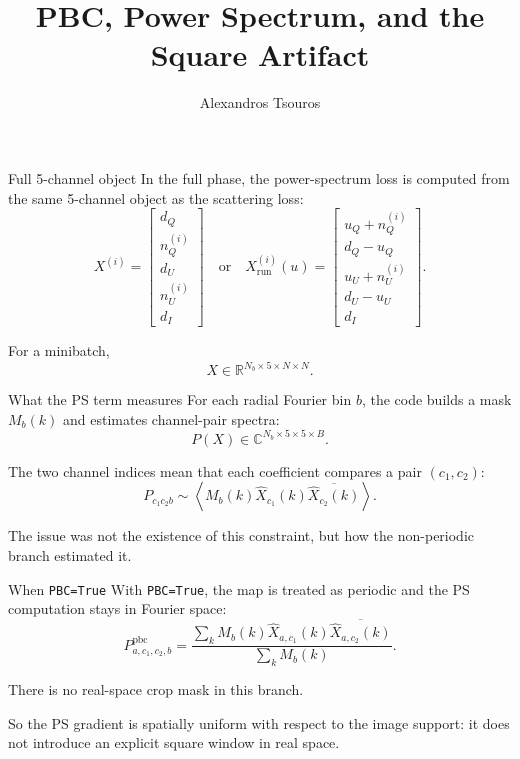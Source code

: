 \documentclass[aspectratio=169,11pt]{beamer}
\title[PBC and PS Artifact]{PBC, Power Spectrum, and the Square Artifact}
\author{Alexandros Tsouros}
\date{}
\begin{document}
\begin{frame}[fragile]
  \titlepage
\end{frame}

\begin{frame}[fragile]{Full 5-channel object}
In the full phase, the power-spectrum loss is computed from the same
5-channel object as the scattering loss:
\[
  X^{(i)}
  =
  \begin{bmatrix}
    d_Q\\
    n_Q^{(i)}\\
    d_U\\
    n_U^{(i)}\\
    d_I
  \end{bmatrix}
  \quad\text{or}\quad
  X_{\mathrm{run}}^{(i)}(u)
  =
  \begin{bmatrix}
    u_Q+n_Q^{(i)}\\
    d_Q-u_Q\\
    u_U+n_U^{(i)}\\
    d_U-u_U\\
    d_I
  \end{bmatrix}.
\]

\vspace{0.25em}
For a minibatch,
\[
  X\in\mathbb{R}^{N_b\times5\times N\times N}.
\]
\end{frame}

\begin{frame}[fragile]{What the PS term measures}
For each radial Fourier bin $b$, the code builds a mask $M_b(k)$ and estimates
channel-pair spectra:
\[
  P(X)\in\mathbb{C}^{N_b\times5\times5\times B}.
\]

\vspace{0.25em}
The two channel indices mean that each coefficient compares a pair
$(c_1,c_2)$:
\[
  P_{c_1c_2b}
  \sim
  \left\langle
    M_b(k)\widehat X_{c_1}(k)
    \overline{\widehat X_{c_2}(k)}
  \right\rangle.
\]

\vspace{0.25em}
The issue was not the existence of this constraint, but how the non-periodic
branch estimated it.
\end{frame}

\begin{frame}[fragile]{When \texttt{PBC=True}}
With \texttt{PBC=True}, the map is treated as periodic and the PS computation
stays in Fourier space:
\[
  P^{\mathrm{pbc}}_{a,c_1,c_2,b}
  =
  \frac{
    \sum_k
    M_b(k)\widehat X_{a,c_1}(k)
    \overline{\widehat X_{a,c_2}(k)}
  }{
    \sum_k M_b(k)
  }.
\]

\vspace{0.25em}
There is no real-space crop mask in this branch.

\vspace{0.25em}
So the PS gradient is spatially uniform with respect to the image support:
it does not introduce an explicit square window in real space.
\end{frame}
\end{document}
